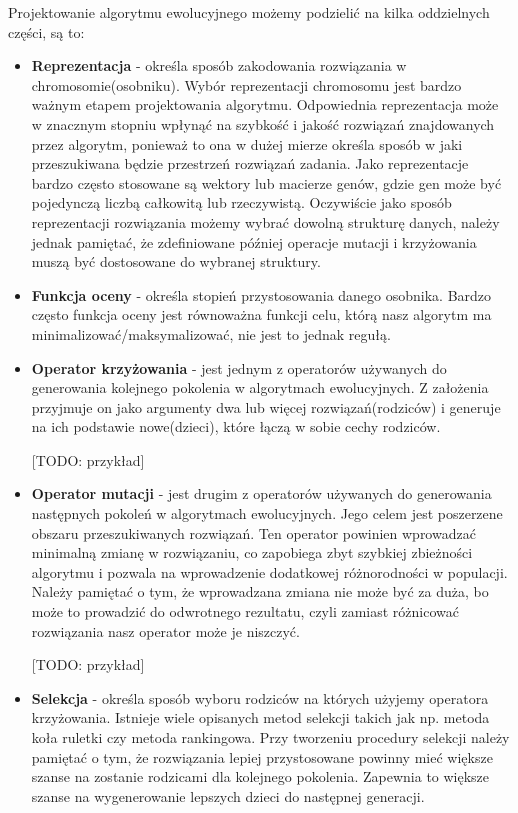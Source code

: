 Projektowanie algorytmu ewolucyjnego możemy podzielić na kilka oddzielnych części, są to: 
\begin{itemize}
    \item \textbf{Reprezentacja} - określa sposób zakodowania rozwiązania w chromosomie(osobniku). Wybór reprezentacji chromosomu jest bardzo ważnym etapem 
    projektowania algorytmu. Odpowiednia reprezentacja może w znacznym stopniu wpłynąć na szybkość i jakość rozwiązań znajdowanych przez 
    algorytm, ponieważ to ona w dużej mierze określa sposób w jaki przeszukiwana będzie przestrzeń rozwiązań zadania. 
    Jako reprezentacje bardzo często stosowane są wektory lub macierze genów, gdzie gen może być pojedynczą liczbą całkowitą lub rzeczywistą. 
    Oczywiście jako sposób reprezentacji rozwiązania możemy wybrać dowolną strukturę danych, należy jednak pamiętać, że zdefiniowane później 
    operacje mutacji i krzyżowania muszą być dostosowane do wybranej struktury.
    
    \item \textbf{Funkcja oceny} - określa stopień przystosowania danego osobnika. Bardzo często funkcja oceny jest równoważna funkcji celu, którą 
    nasz algorytm ma minimalizować/maksymalizować, nie jest to jednak regułą. 

    \item \textbf{Operator krzyżowania} - jest jednym z operatorów używanych do generowania kolejnego pokolenia w algorytmach ewolucyjnych. Z założenia 
    przyjmuje on jako argumenty dwa lub więcej rozwiązań(rodziców) i generuje na ich podstawie nowe(dzieci), które łączą w sobie cechy rodziców. 
    
    [TODO: przykład]

    \item \textbf{Operator mutacji} - jest drugim z operatorów używanych do generowania następnych pokoleń w algorytmach ewolucyjnych. Jego celem jest 
    poszerzene obszaru przeszukiwanych rozwiązań. Ten operator powinien wprowadzać minimalną zmianę w rozwiązaniu, co zapobiega zbyt szybkiej 
    zbieżności algorytmu i pozwala na wprowadzenie dodatkowej różnorodności w populacji. Należy pamiętać o tym, że wprowadzana zmiana nie może 
    być za duża, bo może to prowadzić do odwrotnego rezultatu, czyli zamiast różnicować rozwiązania nasz operator może je niszczyć.
    
    [TODO: przykład]

    \item \textbf{Selekcja} - określa sposób wyboru rodziców na których użyjemy operatora krzyżowania. Istnieje wiele opisanych metod selekcji\cite{SELECTION-METHODS} 
    takich jak np. metoda koła ruletki czy metoda rankingowa. Przy tworzeniu procedury selekcji należy pamiętać 
    o tym, że rozwiązania lepiej przystosowane powinny mieć większe szanse na zostanie rodzicami dla kolejnego pokolenia. Zapewnia to większe 
    szanse na wygenerowanie lepszych dzieci do następnej generacji.
    

\end{itemize}
